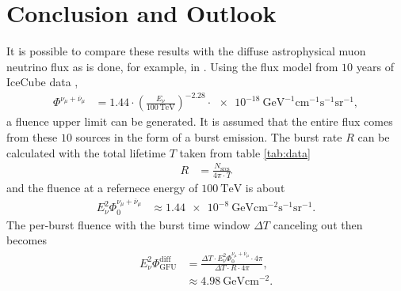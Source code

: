 \chapter{Conclusion and Outlook} \label{sec:outlook}

It is possible to compare these results with the diffuse astrophysical muon neutrino flux as is done, for example, in \cite{thorben}.
Using the flux model from $\num{10}$ years of IceCube data \cite{flux_2},
\begin{align}
  \Phi^{\nu_\mu + \overline{\nu}_\mu} &= 1.44\cdot\left(\frac{E_\nu}{\SI{100}{\tera\electronvolt}}\right)^{-2.28}\cdot\SI{e-18}{\giga\electronvolt\tothe{-1}\centi\meter\tothe{-1}\second\tothe{-1}\steradian\tothe{-1}},
\end{align}
a fluence upper limit can be generated.
It is assumed that the entire flux comes from these $\num{10}$ sources in the form of a burst emission.
The burst rate $R$ can be calculated with the total lifetime $T$ taken from table \ref{tab:data}
\begin{align}
  R &= \frac{N_\text{srcs}}{4\pi\cdot T}
\end{align}
and the fluence at a refernece energy of $\SI{100}{\tera\electronvolt}$ is about
\begin{align}
  E^2_\nu\Phi_0^{\nu_\mu + \overline{\nu}_\mu} &\approx \SI{1.44e-8}{\giga\electronvolt\centi\meter\tothe{-2}\second\tothe{-1}\steradian\tothe{-1}}.
\end{align}
The per-burst fluence with the burst time window $\Delta T$ canceling out then becomes
\begin{align}
  E^2_\nu\Phi_\text{GFU}^\text{diff} &= \frac{\Delta T \cdot E^2_\nu\Phi_0^{\nu_\mu + \overline{\nu}_\mu} \cdot 4\pi}{\Delta T \cdot R \cdot 4\pi},\\
  &\approx \SI{4.98}{\giga\electronvolt\centi\meter\tothe{-2}}.
\end{align}


